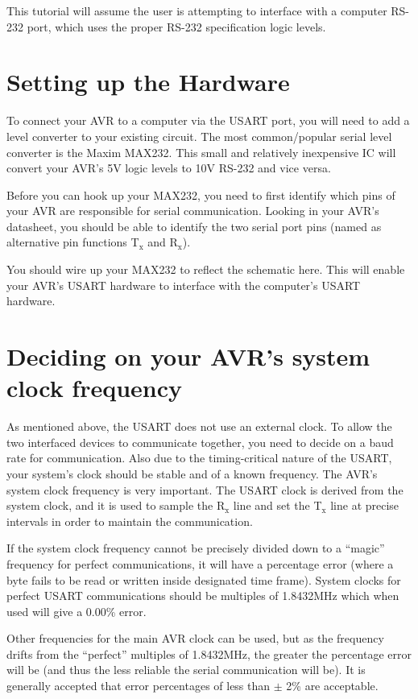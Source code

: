 \documentclass[a4paper,oneside]{book}
\newcommand{\subscript}[1]{\ensuremath{_{\textrm{#1}}}}
\begin{document}
This tutorial will assume the user is attempting to interface with a computer RS-232 port, which uses the proper RS-232 specification logic levels.


\chapter{Setting up the Hardware}

To connect your AVR to a computer via the USART port, you will need to add a level converter to your existing circuit. The most common/popular serial level converter is the Maxim MAX232. This small and relatively inexpensive IC will convert your AVR's 5V logic levels to 10V RS-232 and vice versa.

Before you can hook up your MAX232, you need to first identify which pins of your AVR are responsible for serial communication. Looking in your AVR's datasheet, you should be able to identify the two serial port pins (named as alternative pin functions T\subscript{x} and R\subscript{x}).

You should wire up your MAX232 to reflect the schematic here. This will enable your AVR's USART hardware to interface with the computer's USART hardware.


\chapter{Deciding on your AVR's system clock frequency}

As mentioned above, the USART does not use an external clock. To allow the two interfaced devices to communicate together, you need to decide on a baud rate for communication. Also due to the timing-critical nature of the USART, your system's clock should be stable and of a known frequency. The AVR's system clock frequency is very important. The USART clock is derived from the system clock, and it is used to sample the R\subscript{x} line and set the T\subscript{x} line at precise intervals in order to maintain the communication.

If the system clock frequency cannot be precisely divided down to a ``magic'' frequency for perfect communications, it will have a percentage error (where a byte fails to be read or written inside designated time frame). System clocks for perfect USART communications should be multiples of 1.8432MHz which when used will give a 0.00\% error.

Other frequencies for the main AVR clock can be used, but as the frequency drifts from the ``perfect'' multiples of 1.8432MHz, the greater the percentage error will be (and thus the less reliable the serial communication will be). It is generally accepted that error percentages of less than \ensuremath{\pm} 2\% are acceptable.
\end{document}
